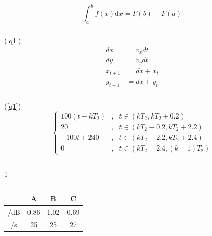 \documentclass{article}
\begin{document}
\subsubsection{ }
\begin{equation}
    \int_a^b f(x)\mathrm{d}x=F(b)-F(a)
\end{equation}

\subsubsection{ }
 (\ref{q1}) 
\begin{equation}
    \label{q1}
    \begin{aligned}
        dx      & =v_{x}dt  \\
        dy      & =v_{y}dt  \\
        x_{t+1} & =dx+x_{t} \\
        y_{t+1} & =dx+y_{t}
    \end{aligned}
\end{equation}

\subsubsection{ }
 (\ref{q1}) 
\begin{equation}
    \left\{
    \begin{aligned}
        100(t-kT_{2}) & , & t\in (kT_{2}, kT_{2}+0.2 )    \\
        20            & , & t\in (kT_{2}+0.2,kT_{2}+2.2)  \\
        -100t+240     & , & t\in( kT_{2}+2.2, kT_{2}+2.4) \\
        0             & , & t\in (kT_{2}+2.4,(k+1)T_{2})
    \end{aligned}
    \right.
\end{equation}

\subsection{ }
\subsubsection{ }
 \ref{table1} 

\begin{table}[H]
    \fontsize{10.5bp}{1.25}
    \caption{ }
    \centering\label{table1}
    \begin{tabular}{|c|c|c|c|}
        \hline %
                & A  & B  & C  \\ \hline
         /dB    & 0.86  & 1.02  & 0.69  \\ \hline
         /s & 25    & 25    & 27    \\ \hline
    \end{tabular}
\end{table}
\end{document}
